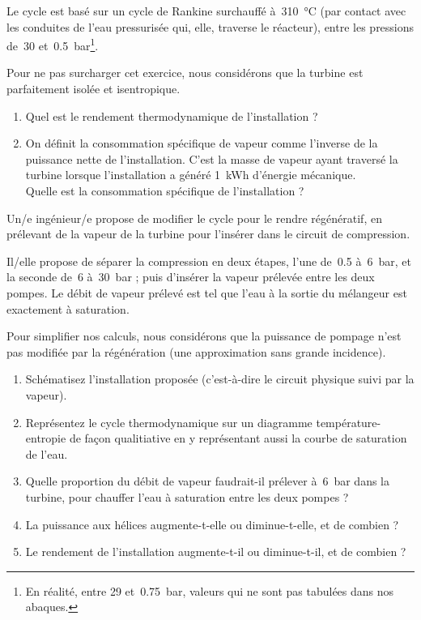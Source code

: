 	Le cycle est basé sur un cycle de Rankine surchauffé à~\SI{310}{\degreeCelsius} (par contact avec les conduites de l’eau pressurisée qui, elle, traverse le réacteur), entre les pressions de~\num{30} et~\SI{0,5}{\bar}\footnote{En réalité, entre \num{29} et~\SI{0,75}{\bar}, valeurs qui ne sont pas tabulées dans nos abaques.}. 
	
	Pour ne pas surcharger cet exercice, nous considérons que la turbine est parfaitement isolée et isentropique.

	\begin{enumerate}
		\item Quel est le rendement thermodynamique de l’installation ?
		\item On définit la consommation spécifique de vapeur comme l’inverse de la puissance nette de l’installation. C’est la masse de vapeur ayant traversé la turbine lorsque l’installation a généré \SI{1}{\kWh} d’énergie mécanique.\\
			Quelle est la consommation spécifique de l’installation ?
	\end{enumerate}

	Un/e ingénieur/e propose de modifier le cycle pour le rendre régénératif, en prélevant de la vapeur de la turbine pour l’insérer dans le circuit de compression.
	
	Il/elle propose de séparer la compression en deux étapes, l’une de~\num{0,5} à~\SI{6}{\bar}, et la seconde de~\num{6} à~\SI{30}{\bar} ; puis d’insérer la vapeur prélevée entre les deux pompes. Le débit de vapeur prélevé est tel que l’eau à la sortie du mélangeur est exactement à saturation.
	
	Pour simplifier nos calculs, nous considérons que la puissance de pompage n’est pas modifiée par la régénération (une approximation sans grande incidence).
	
	\begin{enumerate}	
		\item Schématisez l’installation proposée (c’est-à-dire le circuit physique suivi par la vapeur).
		\item Représentez le cycle thermodynamique sur un diagramme température-entropie de façon qualitiative en y représentant aussi la courbe de saturation de l’eau.
		\item Quelle proportion du débit de vapeur faudrait-il prélever à~\SI{6}{\bar} dans la turbine, pour chauffer l’eau à saturation entre les deux pompes ?
		\item La puissance aux hélices augmente-t-elle ou diminue-t-elle, et de combien ?
		\item Le rendement de l’installation augmente-t-il ou diminue-t-il, et de combien ?
	\end{enumerate}

